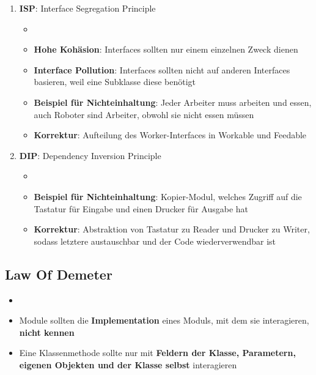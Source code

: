 \begin{enumerate}
\begin{itemize}
	\end{itemize}
	\item \textbf{ISP}: Interface Segregation Principle
	\begin{itemize}
		\item {}
		\item \textbf{Hohe Kohäsion}: Interfaces sollten nur einem einzelnen Zweck dienen
		\item \textbf{Interface Pollution}: Interfaces sollten nicht auf anderen Interfaces basieren, weil eine Subklasse diese benötigt
		\item \textbf{Beispiel für Nichteinhaltung}: Jeder Arbeiter muss arbeiten und essen, auch Roboter sind Arbeiter, obwohl sie nicht essen müssen
		\item \textbf{Korrektur}: Aufteilung des Worker-Interfaces in Workable und Feedable
	\end{itemize}
	\item \textbf{DIP}: Dependency Inversion Principle
	\begin{itemize}
		\item {}
		\item \textbf{Beispiel für Nichteinhaltung}: Kopier-Modul, welches Zugriff auf die Tastatur für Eingabe und einen Drucker für Ausgabe hat
		\item \textbf{Korrektur}: Abstraktion von Tastatur zu Reader und Drucker zu Writer, sodass letztere austauschbar und der Code wiederverwendbar ist
	\end{itemize}
\end{enumerate}

\subsection{Law Of Demeter}
\label{cc:sub:law_of_demeter}

\begin{itemize}
	\item {}
	\item Module sollten die \textbf{Implementation} eines Moduls, mit dem sie interagieren, \textbf{nicht kennen}
	\item Eine Klassenmethode sollte nur mit \textbf{Feldern der Klasse, Parametern, eigenen Objekten und der Klasse selbst} interagieren
\end{itemize}

